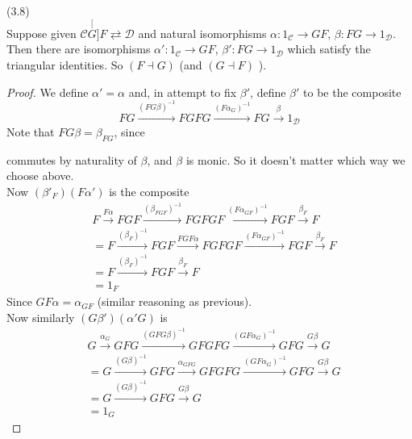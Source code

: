 \documentclass[a4paper]{article}
\begin{document}
\begin{lemma} (3.8)\\
    Suppose given $\mathcal{C} \stackrel[G]{F}{\rightleftarrows} \mathcal{D}$ and natural isomorphisms $\alpha:1_{\mathcal{C}} \to GF$, $\beta: FG \to 1_{\mathcal{D}}$. Then there are isomorphisms $\alpha': 1_{\mathcal{C}} \to GF$, $\beta':FG \to 1_{\mathcal{D}}$ which satisfy the triangular identities. So $(F \dashv G)$ (and $(G \dashv F)$ ).
    \begin{proof}
        We define $\alpha'=\alpha$ and, in attempt to fix $\beta'$, define $\beta'$ to be the composite
        $$FG \xrightarrow{(FG\beta)^{-1}} FGFG \xrightarrow{(F\alpha_G)^{-1}} FG \xrightarrow{\beta} 1_{\mathcal{D}}$$
        Note that $FG\beta = \beta_{FG}$, since


        commutes by naturality of $\beta$, and $\beta$ is monic. So it doesn't matter which way we choose above.\\
        Now $(\beta'_F)(F\alpha')$ is the composite
        \begin{equation*}
            \begin{aligned}
                &F \xrightarrow{F\alpha} FGF \xrightarrow{(\beta_{FGF})^{-1}} FGFGF \xrightarrow{(F\alpha_{GF})^{-1}} FGF \xrightarrow{\beta_F} F\\
                &=F\xrightarrow{(\beta_F)^{-1}} FGF \xrightarrow{FGF\alpha} FGFGF \xrightarrow{(F\alpha_{GF})^{-1}} FGF \xrightarrow{\beta_F} F\\
                &= F \xrightarrow{(\beta_F)^{-1}} FGF \xrightarrow{\beta_F} F\\
                &= 1_F
            \end{aligned}
        \end{equation*}
        Since $GF\alpha = \alpha_{GF}$ (similar reasoning as previous).\\
        Now similarly $(G\beta')(\alpha'G)$ is
        \begin{equation*}
            \begin{aligned}
                &G \xrightarrow{\alpha_G} GFG \xrightarrow{(GFG\beta)^{-1}} GFGFG\xrightarrow{(GF\alpha_G)^{-1}} GFG \xrightarrow{G\beta} G\\
                &= G \xrightarrow{(G\beta)^{-1}} GFG \xrightarrow{\alpha_{GFG}} GFGFG \xrightarrow{(GF\alpha_G)^{-1}} GFG \xrightarrow{G\beta} G\\
                &= G\xrightarrow{(G\beta)^{-1}} GFG \xrightarrow{G\beta} G\\
                &= 1_G
            \end{aligned}
        \end{equation*}
    \end{proof}
\end{lemma}
\end{document}
